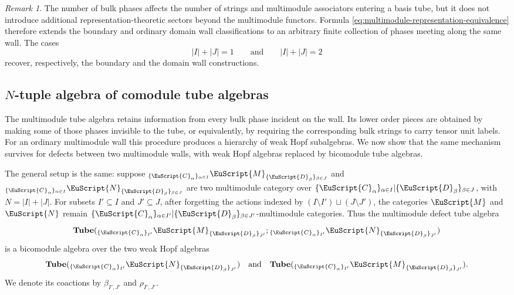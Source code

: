 \documentclass[a4paper,11pt]{article}
\theoremstyle{definition}
\theoremstyle{remark}
\newtheorem{remark}[theorem]{Remark}
\newcommand\eC           {\EuScript{C}}
\newcommand\eD           {\EuScript{D}}
\newcommand\eM          {\EuScript{M}}
\newcommand\eN         {\EuScript{N}}
\newcommand{\Tube}{\mathbf{Tube}}
\begin{document}
\begin{remark}
    The number of bulk phases affects the number of strings and
    multimodule associators entering a basis tube, but it does not
    introduce additional representation-theoretic sectors beyond the
    multimodule functors.  Formula
    \eqref{eq:multimodule-representation-equivalence} therefore
    extends the boundary and ordinary domain wall classifications to
    an arbitrary finite collection of phases meeting along the same
    wall.  The cases
    \begin{equation}
        |I|+|J|=1
        \qquad\text{and}\qquad
        |I|+|J|=2
    \end{equation}
    recover, respectively, the boundary and the
    domain wall constructions.
\end{remark}














\subsection{$N$-tuple algebra of comodule tube algebras}
\label{sec:Ntuplealge}


The multimodule tube algebra retains information from every bulk phase incident on the wall.  Its lower order pieces are obtained by making some of those phases invisible to the tube, or equivalently, by requiring the corresponding bulk strings to carry tensor unit labels.  For an ordinary multimodule wall this procedure produces a hierarchy of weak Hopf subalgebras.  We now show that the same mechanism survives for defects between two multimodule walls, with weak Hopf algebras replaced by bicomodule tube algebras.


The general setup is the same: suppose ${}_{\{\eC_{\alpha}\}_{\alpha\in I}}\eM_{\{\eD_{\beta}\}_{\beta\in J}}$ and ${}_{\{\eC_{\alpha}\}_{\alpha\in I}}\eN_{\{\eD_{\beta}\}_{\beta\in J}}$ are two multimodule category over $\{\eC_{\alpha}\}_{\alpha\in I}|\{\eD_{\beta}\}_{\beta\in J}$, with $N=|I|+|J|$. 
For subsets $I'\subseteq I$ and $J'\subseteq J$, after forgetting the actions indexed by $(I\setminus I')\sqcup(J\setminus J')$, the categories $\eM$ and $\eN$ remain $\{\eC_{\alpha}\}_{\alpha\in I'}|\{\eD_{\beta}\}_{\beta\in J'}$-multimodule categories.  Thus the multimodule defect tube algebra 
\[
    \Tube({}_{\{\eC_{\alpha}\}_{I'}}\eM_{\{\eD_{\beta}\}_{J'}};{}_{\{\eC_{\alpha}\}_{I'}}\eN_{\{\eD_{\beta}\}_{J'}})
\]
is a bicomodule algebra over the two weak Hopf algebras
\[
    \Tube({}_{\{\eC_{\alpha}\}_{I'}}\eN_{\{\eD_{\beta}\}_{J'}})\quad \text{and}\quad \Tube({}_{\{\eC_{\alpha}\}_{I'}}\eM_{\{\eD_{\beta}\}_{J'}}). 
\]
We denote its coactions by $\beta_{I',J'}$ and $\rho_{I',J'}$. 
\end{document}
